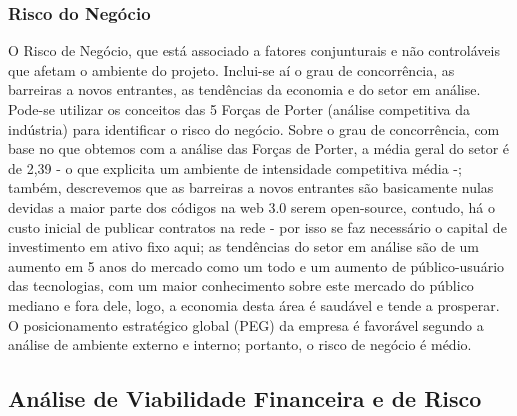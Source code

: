 \documentclass[onecolumn,12pt]{asme2ej}
\begin{document}
\subsubsection{Risco do Negócio}

O Risco de Negócio, que está associado a fatores conjunturais e não controláveis que afetam o ambiente do projeto. Inclui-se aí o grau de concorrência, as barreiras a novos entrantes, as tendências da economia e do setor em análise. Pode-se utilizar os conceitos das 5 Forças de Porter (análise competitiva da indústria) para identificar o risco do negócio. Sobre o grau de concorrência, com base no que obtemos com a análise das Forças de Porter, a média geral do setor é de 2,39 - o que explicita um ambiente de intensidade competitiva média -; também, descrevemos que as barreiras a novos entrantes são basicamente nulas devidas a maior parte dos códigos na web 3.0 serem open-source, contudo, há o custo inicial de publicar contratos na rede - por isso se faz necessário o capital de investimento em ativo fixo aqui; as tendências do setor em análise são de um aumento em 5 anos do mercado como um todo e um aumento de público-usuário das tecnologias, com um maior conhecimento sobre este mercado do público mediano e fora dele, logo, a economia desta área é saudável e tende a prosperar. O posicionamento estratégico global (PEG) da empresa é favorável segundo a análise de ambiente externo e interno; portanto, o risco de negócio é médio.

\subsection{Análise de Viabilidade Financeira e de Risco}
\end{document}
